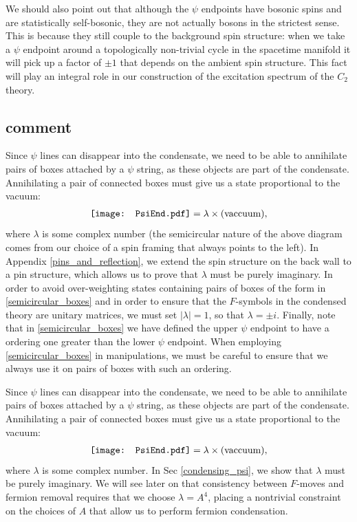 \documentclass[12pt,a4paper]{article}
\newcommand{\PsiEnd}{\mathord{\vcenter{\hbox{\texttt{[image: PsiEnd.pdf]}}}}}
\begin{document}
We should also point out that although the $\psi$ endpoints have bosonic 
spins and are statistically self-bosonic, they are not actually bosons in the strictest sense. 
This is because they still couple to the background spin structure: 
when we take a $\psi$ endpoint around a topologically non-trivial cycle in the 
spacetime manifold it will pick up a factor of $\pm1$ that depends on the ambient spin structure. 
This fact will play an integral role in our construction of the excitation spectrum of the $C_2$ theory. 
 
 







 
\subsection{comment}
Since $\psi$ lines can disappear into the condensate, we need to be able to 
annihilate pairs of boxes attached by a $\psi$ string, as these objects are part of the condensate. 
Annihilating a pair of connected boxes must give us a state proportional to the vacuum:
\begin{align} \label{semicircular_boxes}
\PsiEnd  = \lambda \times \text{(vaccuum)},
\end{align}
where $\lambda$ is some complex number (the semicircular nature of the above diagram comes 
from our choice of a spin framing that always points to the left). 
In Appendix \ref{pins_and_reflection}, we extend the spin structure on the back wall to a pin structure, 
which allows us to prove that $\lambda$ must be purely imaginary. 
In order to avoid over-weighting states containing pairs of boxes 
of the form in \eqref{semicircular_boxes} and in order to ensure that the 
$F$-symbols in the condensed theory are unitary matrices, we must set 
$|\lambda|=1$, so that $\lambda = \pm i$. 
Finally, note that in \eqref{semicircular_boxes} we have defined the upper $\psi$ endpoint
to have a ordering one greater than the lower $\psi$ endpoint. 
When employing \eqref{semicircular_boxes} in manipulations, we must be careful to ensure 
that we always use it on pairs of boxes with such an ordering. 

Since $\psi$ lines can disappear into the condensate, we need to be able to annihilate pairs of boxes attached by a $\psi$ string, as these objects are part of the condensate. Annihilating a pair of connected boxes must give us a state proportional to the vacuum:
\begin{align} 
\PsiEnd  = \lambda \times \text{(vaccuum)},
\label{EvalPsiPsi}
\end{align}
where $\lambda$ is some complex number. In Sec \ref{condensing_psi}, we show that $\lambda$ must be purely imaginary. We will see later on that consistency between $F$-moves and fermion removal requires that we choose $\lambda = A^4$, placing a nontrivial constraint on the choices of $A$ that allow us to perform fermion condensation. 
 
\end{document}
